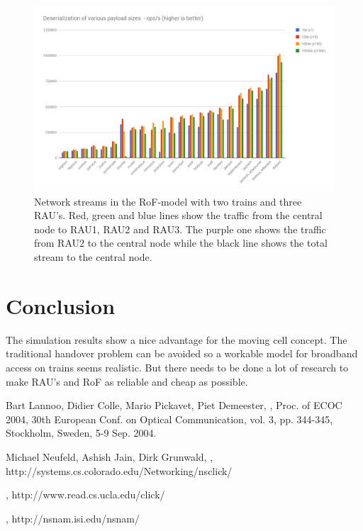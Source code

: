 \documentclass[twocolumn]{phdsymp} %
\begin{document}
\begin{figure}[ht]
\begin{center}
	\includegraphics[width=.40\textwidth]{images/jsondeserialization.png}
	\caption{\label{2trein3rau}Network streams in the RoF-model with two trains and three RAU's.  Red, green and blue lines show the traffic from the central node to RAU1, RAU2 and RAU3.  The purple one shows the traffic from RAU2 to the central node while the black line shows the total stream to the central node.}
\end{center}
\end{figure}


\section{Conclusion}
The simulation results show a nice advantage for the moving cell concept.  The traditional handover problem can be avoided so a workable model for broadband access on trains seems realistic.  But there needs to be done a lot of research to make RAU's and RoF as reliable and cheap as possible.

\nocite{*}



%
\begin{thebibliography}{1}
Bart Lannoo, Didier Colle, Mario Pickavet, Piet Demeester,
,
\newblock Proc. of ECOC 2004, 30th European Conf. on Optical Communication, vol. 3, pp. 344-345, Stockholm, Sweden, 5-9 Sep. 2004.

Michael Neufeld, Ashish Jain, Dirk Grunwald,
,
\newblock http://systems.cs.colorado.edu/Networking/nsclick/

,
\newblock http://www.read.cs.ucla.edu/click/

,
\newblock http://nsnam.isi.edu/nsnam/

\end{thebibliography}
%
\end{document}
